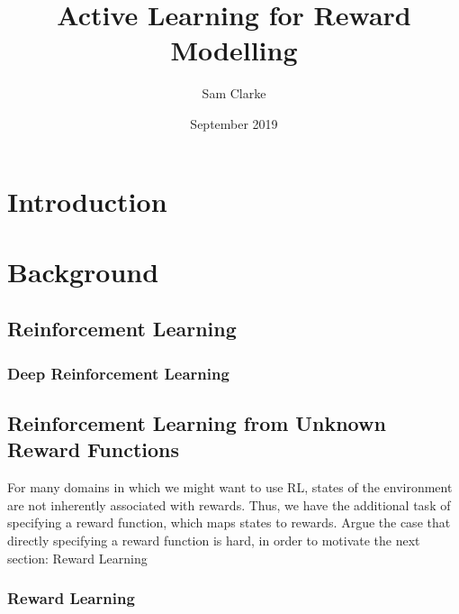 \documentclass[11pt, a4paper, bibliography=totoc]{report}
\begin{document}
\title{Active Learning for Reward Modelling}
\author{Sam Clarke}
\date{September 2019}
\renewcommand{\bibname}{References}
\maketitle

\begin{abstract} %

\end{abstract}

\tableofcontents

\chapter{Introduction}

\chapter{Background} %
\section{Reinforcement Learning}
\subsection{Deep Reinforcement Learning}

\section{Reinforcement Learning from Unknown Reward Functions}
For many domains in which we might want to use RL, states of the environment are not inherently associated with rewards.  Thus, we have the additional task of specifying a reward function, which maps states to rewards. Argue the case that directly specifying a reward function is hard, in order to motivate the next section: Reward Learning
\subsection{Reward Learning}
\end{document}
